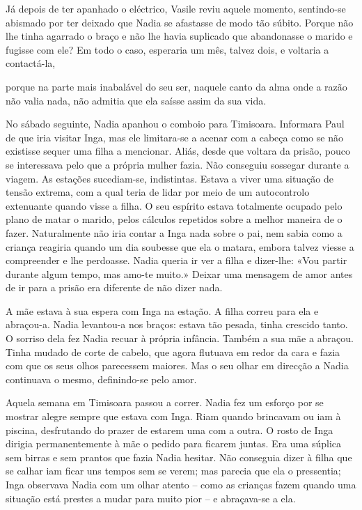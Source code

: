 Já depois de ter apanhado o eléctrico, Vasile reviu aquele momento,
sentindo-se abismado por ter deixado que Nadia se afastasse de modo tão
súbito. Porque não lhe tinha agarrado o braço e não lhe havia suplicado
que abandonasse o marido e fugisse com ele? Em todo o caso, esperaria um
mês, talvez dois, e voltaria a contactá-la,

porque na parte mais inabalável do seu ser, naquele canto da alma onde a
razão não valia nada, não admitia que ela saísse assim da sua vida.

No sábado seguinte, Nadia apanhou o comboio para Timisoara. Informara
Paul de que iria visitar Inga, mas ele limitara-se a acenar com a cabeça
como se não existisse sequer uma filha a mencionar. Aliás, desde que
voltara da prisão, pouco se interessava pelo que a própria mulher fazia.
Não conseguiu sossegar durante a viagem. As estações sucediam-se,
indistintas. Estava a viver uma situação de tensão extrema, com a qual
teria de lidar por meio de um autocontrolo extenuante quando visse a
filha. O seu espírito estava totalmente ocupado pelo plano de matar o
marido, pelos cálculos repetidos sobre a melhor maneira de o fazer.
Naturalmente não iria contar a Inga nada sobre o pai, nem sabia como a
criança reagiria quando um dia soubesse que ela o matara, embora talvez
viesse a compreender e lhe perdoasse. Nadia queria ir ver a filha e
dizer-lhe: «Vou partir durante algum tempo, mas amo-te muito.» Deixar
uma mensagem de amor antes de ir para a
prisão era diferente de não dizer nada.

A mãe estava à sua espera com Inga na estação. A filha correu para ela e
abraçou-a. Nadia levantou-a nos braços: estava tão pesada, tinha
crescido tanto. O sorriso dela fez Nadia recuar à própria infância.
Também a sua mãe a abraçou. Tinha mudado de corte de cabelo, que agora
flutuava em redor da cara e fazia com que os seus olhos parecessem
maiores. Mas o seu olhar em direcção a Nadia continuava o mesmo,
definindo-se pelo amor.

Aquela semana em Timisoara passou a correr. Nadia fez um esforço por se
mostrar alegre sempre que estava com Inga. Riam quando brincavam ou iam
à piscina, desfrutando do prazer de estarem uma com a outra. O rosto
de Inga dirigia permanentemente à mãe o pedido para ficarem juntas.
Era uma súplica sem birras e sem prantos que fazia Nadia hesitar. Não
conseguia dizer à filha que se calhar iam ficar uns tempos sem se verem;
mas parecia que ela o pressentia; Inga observava Nadia com um olhar
atento -- como as crianças fazem quando uma situação está prestes a
mudar para muito pior -- e abraçava-se a ela.

